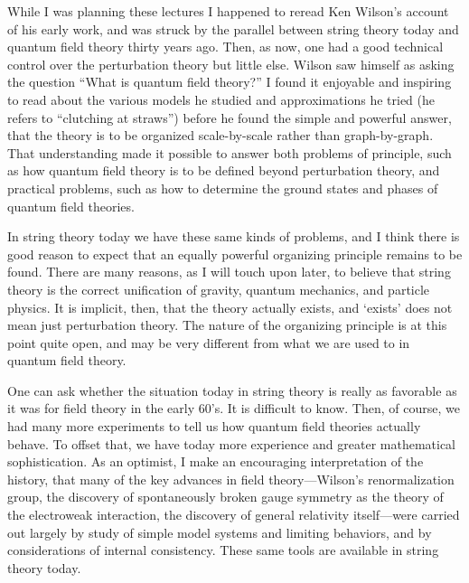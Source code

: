 While I was planning these lectures I happened to reread
Ken Wilson's account of his early work\cite{wilson}, and
was struck by the parallel between string theory today
and quantum field theory thirty years ago.  Then, as now, one had a
good technical control over the perturbation theory but little else. 
Wilson saw himself as asking the question ``What is quantum field
theory?''  I found it enjoyable and inspiring to read about the
various models he studied and approximations he tried (he refers
to ``clutching at straws'') before he found the simple and powerful
answer, that the theory is to be organized scale-by-scale rather
than graph-by-graph.  That understanding made it possible to answer
both problems of principle, such as how quantum field theory is to
be defined beyond perturbation theory, and practical problems,
such as how to
determine the ground states and phases of quantum field theories.

In string theory today we have these same kinds of problems, and I
think there is good reason to expect that an equally powerful
organizing principle remains to be found.  There are many reasons,
as I will touch upon later, to believe that string theory is the
correct unification of gravity, quantum mechanics, and particle
physics.  It is implicit, then, that the theory actually exists,
and `exists' does not mean just perturbation theory.  The nature
of the organizing principle is at this point quite open, and may
be very different from what we are used to in quantum field theory.

One can ask whether the situation today in string theory is really
as favorable as it was for field theory in the early 60's.
It is difficult to know.  Then,
of course, we had many more experiments to tell us how
quantum field theories actually behave.  To offset that, we
have today more experience and greater mathematical
sophistication.  As an optimist, I make an encouraging
interpretation of the history, that many of the key
advances in field theory---Wilson's renormalization group, the
discovery of spontaneously broken gauge symmetry as the theory of the
electroweak interaction, the discovery of general relativity
itself---were carried out largely by study of simple model
systems and limiting behaviors, and by considerations of internal
consistency.  These same tools are available in string theory
today.

